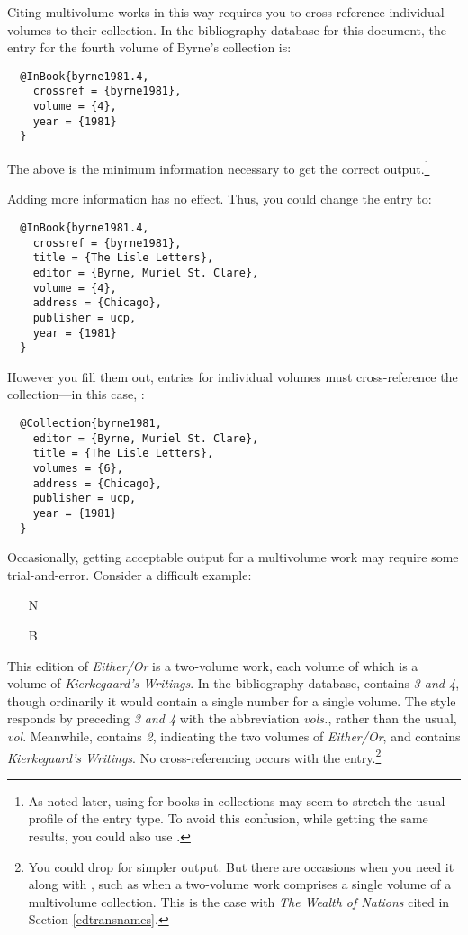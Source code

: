\documentclass[11pt,letterpaper,oneside]{article}
\begin{document}
Citing multivolume works in this way requires you to cross-reference
individual volumes to their collection. In the bibliography database
for this document, the entry for the fourth volume of Byrne's
collection is:

\begin{lstlisting}
  @InBook{byrne1981.4,
    crossref = {byrne1981},
    volume = {4},
    year = {1981}
  }
\end{lstlisting}

\noindent The above is the minimum information necessary to get the
correct output.\footnote{As noted later, using  for
books in collections may seem to stretch the usual profile of the
entry type. To avoid this confusion, while getting the same results,
you could also use .}

Adding more information has no effect. Thus, you could change the
entry to:

\begin{lstlisting}
  @InBook{byrne1981.4,
    crossref = {byrne1981},
    title = {The Lisle Letters},
    editor = {Byrne, Muriel St. Clare},
    volume = {4},
    address = {Chicago},
    publisher = ucp,
    year = {1981}
  }
\end{lstlisting}

\noindent However you fill them out, entries for individual volumes
must cross-reference the col\-lec\-tion---in this case,
:

\begin{lstlisting}
  @Collection{byrne1981,
    editor = {Byrne, Muriel St. Clare},
    title = {The Lisle Letters},
    volumes = {6},
    address = {Chicago},
    publisher = ucp,
    year = {1981}
  }
\end{lstlisting}

Occasionally, getting acceptable output for a multivolume work may
require some trial-and-error. Consider a difficult example:

\begin{itemize}
\item[N] 

\item[B] 
\end{itemize}

\noindent This edition of \textit{Either/Or} is a two-volume work,
each volume of which is a volume of \textit{Kierkegaard's Writings}.
In the bibliography database,  contains \textit{3 and
4}, though ordinarily it would contain a single number for a single
volume. The style responds by preceding \textit{3 and 4} with the
abbreviation \textit{vols.}, rather than the usual, \textit{vol}.
Meanwhile,  contains \textit{2}, indicating the two
volumes of \textit{Either/Or}, and  contains
\textit{Kierkegaard's Writings}. No cross-referencing occurs with the
entry.\footnote{You could drop  for simpler output.
But there are occasions when you need it along with
, such as when a two-volume work comprises a single
volume of a multivolume collection. This is the case with \textit{The
Wealth of Nations} cited in Section \ref{edtransnames}.}
\end{document}
